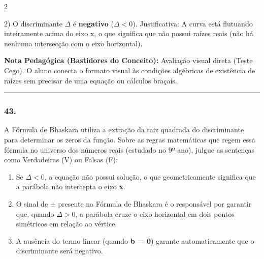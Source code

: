 \begin{multicols*}{2}
\begin{tcolorbox}[colback=CorTitUm!5, colframe=CorTitUm, boxrule=1pt, arc=4pt, left=6pt, right=6pt, top=6pt, bottom=6pt]
    2) O discriminante $\Delta$ é \textbf{negativo} ($\Delta < 0$). 
    Justificativa: A curva está flutuando inteiramente acima do eixo x, o que significa que não possui raízes reais (não há nenhuma intersecção com o eixo horizontal).
    \end{tcolorbox}
    \vspace{0.15cm}
    
    \begin{boxexplicacao}
    \textbf{Nota Pedagógica (Bastidores do Conceito):} Avaliação visual direta (Teste Cego). O aluno conecta o formato visual às condições algébricas de existência de raízes sem precisar de uma equação ou cálculos braçais.
    \end{boxexplicacao}
\fi

\par\vspace{\espacoQuestao}

\noindent\textcolor{CorLinha}{\rule{\linewidth}{0.5pt}} 
\par\vspace{\espacoPreQuestao}
\subsubsection*{43.} 
\begin{enunciadoLiteral}
A Fórmula de Bhaskara utiliza a extração da raiz quadrada do discriminante para determinar os zeros da função. Sobre as regras matemáticas que regem essa fórmula no universo dos números reais (estudado no 9º ano), julgue as sentenças como Verdadeiras (V) ou Falsas (F):

\begin{enumerate}[label=\Roman*., itemsep=\espacoAlt]
    \item Se $\Delta < 0$, a equação não possui solução, o que geometricamente significa que a parábola não intercepta o eixo \textbf{x}.
    \item O sinal de $\pm$ presente na Fórmula de Bhaskara é o responsável por garantir que, quando $\Delta > 0$, a parábola cruze o eixo horizontal em dois pontos simétricos em relação ao vértice.
    \item A ausência do termo linear (quando \textbf{b = 0}) garante automaticamente que o discriminante será negativo.
\end{enumerate}
\end{enunciadoLiteral}


\end{multicols*}
